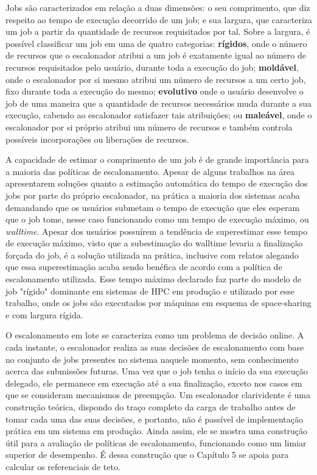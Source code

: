 Jobs são caracterizados em relação a duas dimensões: o seu comprimento, que diz respeito
ao tempo de execução decorrido de um job; e sua largura, que caracteriza um job a partir da quantidade
de recursos requisitados por tal. Sobre a largura, é possível classificar um job em uma de quatro
categorias: \textbf{rígidos}, onde o número de recursos que o escalonador atribui a um job é exatamente
igual ao número de recursos requisitados pelo usuário, durante toda a execução do job; \textbf{moldável},
onde o escalonador por si mesmo atribui um número de recursos a um certo job, fixo durante toda a execução
do mesmo; \textbf{evolutivo} onde o usuário desenvolve o job de uma maneira que a quantidade de recursos
necessários muda durante a sua execução, cabendo ao escalonador satisfazer tais atribuições; ou 
\textbf{maleável}, onde o escalonador por si próprio atribui um número de recursos e também controla
possíveis incorporações ou liberações de recursos.

A capacidade de estimar o comprimento de um job é de grande importância para a maioria das políticas 
de escalonamento. Apesar de alguns trabalhos na área apresentarem soluções quanto a estimação automática
do tempo de execução dos jobs por parte do próprio escalonador, na prática a maioria dos sistemas acaba
demandando que os usuários submetam o tempo de execução que eles esperam que o job tome, nesse caso 
funcionando como um tempo de execução máximo, ou \textit{walltime}. Apesar dos usuários possuírem a tendência
de superestimar esse tempo de execução máximo, visto que a subestimação do walltime levaria a finalização
forçada do job, é a solução utilizada na prática, inclusive com relatos alegando que essa superestimação
acaba sendo benéfica de acordo com a política de escalonamento utilizada. Esse tempo máximo declarado faz parte
do modelo de job "rígido" dominante em sistemas de HPC em produção e utilizado por esse trabalho, 
onde os jobs são executados por máquinas em esquema de space-sharing e com largura rígida.  

O escalonamento em lote se caracteriza como um problema de decisão online. A cada instante, o escalonador
realiza as suas decisões de escalonamento com base no conjunto de jobs presentes no sistema naquele momento, 
sem conhecimento acerca das submissões futuras. Uma vez que o job tenha o início da sua execução delegado,
ele permanece em execução até a sua finalização, exceto nos casos em que se consideram mecanismos de preempção.
Um escalonador clarividente é uma construção teórica, dispondo do traço completo da carga de trabalho antes de tomar
cada uma das suas decisões, e portanto, não é passível de implementação prática em um sistema em produção. 
Ainda assim, ele se mostra uma construção útil para a avaliação de políticas de escalonamento, funcionando 
como um limiar superior de desempenho. É dessa construção que o Capítulo 5 se apoia para calcular os 
referenciais de teto.

